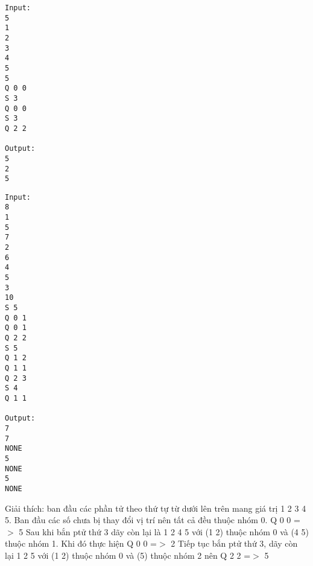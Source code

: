 \begin{verbatim}
Input:
5
1
2
3
4
5
5
Q 0 0
S 3
Q 0 0
S 3
Q 2 2

Output:
5
2
5
\end{verbatim}
\begin{verbatim}
Input:
8
1
5
7
2
6
4
5
3
10
S 5
Q 0 1
Q 0 1
Q 2 2
S 5
Q 1 2
Q 1 1
Q 2 3
S 4
Q 1 1

Output:
7
7
NONE
5
NONE
5
NONE
\end{verbatim}

   Giải thích: ban đầu các phần tử theo thứ tự từ dưới lên trên mang giá trị 1 2 3 4 5. Ban đầu các số chưa bị thay đổi vị trí nên tất cả đều thuộc nhóm 0. Q 0 0 =$>$ 5 Sau khi bắn ptử thứ 3 dãy còn lại là 1 2 4 5 với (1 2) thuộc nhóm 0 và (4 5) thuộc nhóm 1. Khi đó thực hiện Q 0 0 =$>$ 2 Tiếp tục bắn ptử thứ 3, dãy còn lại 1 2 5 với (1 2) thuộc nhóm 0 và (5) thuộc nhóm 2 nên Q 2 2 =$>$ 5